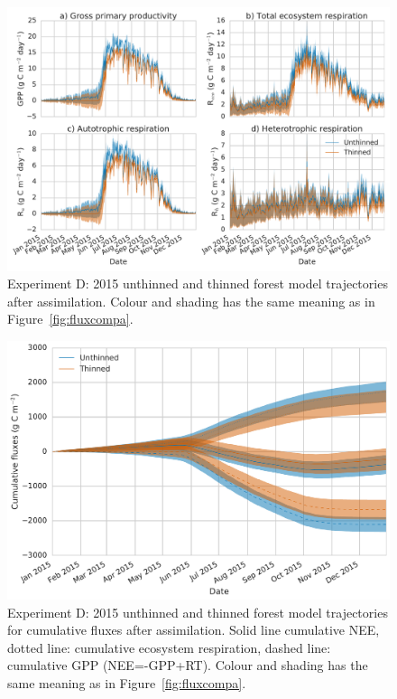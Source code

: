 \documentclass[draft,jgrga]{agutexSI}
\begin{document}
 
 \begin{figure}
 \noindent\includegraphics[width=40pc]{flux_compd.pdf}
\caption{Experiment D: 2015 unthinned and thinned forest model trajectories after assimilation. Colour and shading has the same meaning as in Figure~\ref{fig:fluxcompa}.}
 \label{fig:fluxcompd}
 \end{figure}
 
  \begin{figure}
 \noindent\includegraphics[width=40pc]{cum_fluxd.pdf}
\caption{Experiment D: 2015 unthinned and thinned forest model trajectories for cumulative fluxes after assimilation. Solid line cumulative NEE, dotted line: cumulative ecosystem respiration, dashed line: cumulative GPP (NEE=-GPP+RT). Colour and shading has the same meaning as in Figure~\ref{fig:fluxcompa}.}
 \label{fig:fluxcumd}
 \end{figure}
 
\end{document}

